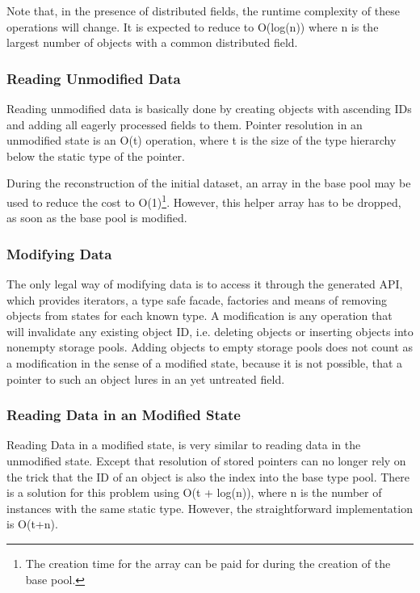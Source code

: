 Note that, in the presence of distributed fields, the runtime complexity of these operations will change. It is expected to reduce to O(log(n)) where n is the largest number of objects with a common distributed field.


\subsubsection{Reading Unmodified Data}

Reading unmodified data is basically done by creating objects with ascending IDs and adding all eagerly processed fields to them. Pointer resolution in an unmodified state is an O(t) operation, where t is the size of the type hierarchy below the static type of the pointer.

During the reconstruction of the initial dataset, an array in the base pool may be used to reduce the cost to O(1)\footnote{The creation time for the array can be paid for during the creation of the base pool.}. However, this helper array has to be dropped, as soon as the base pool is modified.


\subsubsection{Modifying Data}

The only legal way of modifying data is to access it through the generated API, which provides iterators, a type safe facade, factories and means of removing objects from states for each known type.
A modification is any operation that will invalidate any existing object ID, i.e. deleting objects or inserting objects into nonempty storage pools. Adding objects to empty storage pools does not count as a modification in the sense of a modified state, because it is not possible, that a pointer to such an object lures in an yet untreated field.


\subsubsection{Reading Data in an Modified State}

Reading Data in a modified state, is very similar to reading data in the unmodified state. Except that resolution of stored pointers can no longer rely on the trick that the ID of an object is also the index into the base type pool. There is a solution for this problem using O(t + log(n)), where n is the number of instances with the same static type. However, the straightforward implementation is O(t+n).

